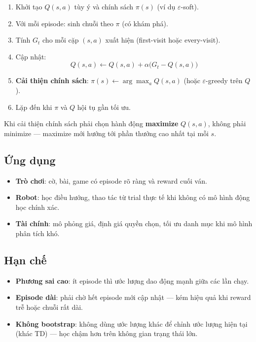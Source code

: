 \begin{phuongphap}[title={Thuật toán MC control (generating traces)}]
\begin{enumerate}
  \item Khởi tạo $Q(s,a)$ tùy ý và chính sách $\pi(s)$ (ví dụ $\varepsilon$-soft).
  \item Với mỗi episode: sinh chuỗi theo $\pi$ (có khám phá).
  \item Tính $G_t$ cho mỗi cặp $(s,a)$ xuất hiện (first-visit hoặc every-visit).
  \item Cập nhật:
  \[
  Q(s,a) \leftarrow Q(s,a) + \alpha\bigl(G_t - Q(s,a)\bigr)
  \]
  \item \textbf{Cải thiện chính sách}: $\pi(s) \leftarrow \arg\max_a Q(s,a)$ (hoặc $\varepsilon$-greedy trên $Q$).
  \item Lặp đến khi $\pi$ và $Q$ hội tụ gần tối ưu.
\end{enumerate}
\end{phuongphap}

\begin{luuy}[title={Sửa nhầm ``minimize $Q$''}]
Khi cải thiện chính sách phải chọn hành động \textbf{maximize} $Q(s,a)$, không phải minimize --- maximize mới hướng tới phần thưởng cao nhất tại mỗi $s$.
\end{luuy}

\subsection{Ứng dụng}

\begin{tinhchat}[title={Ứng dụng điển hình}]
\begin{itemize}
  \item \textbf{Trò chơi}: cờ, bài, game có episode rõ ràng và reward cuối ván.
  \item \textbf{Robot}: học điều hướng, thao tác từ trial thực tế khi không có mô hình động học chính xác.
  \item \textbf{Tài chính}: mô phỏng giá, định giá quyền chọn, tối ưu danh mục khi mô hình phân tích khó.
\end{itemize}
\end{tinhchat}

\subsection{Hạn chế}

\begin{luuy}[title={Hạn chế Monte Carlo}]
\begin{itemize}
  \item \textbf{Phương sai cao}: ít episode thì ước lượng dao động mạnh giữa các lần chạy.
  \item \textbf{Episode dài}: phải chờ hết episode mới cập nhật --- kém hiệu quả khi reward trễ hoặc chuỗi rất dài.
  \item \textbf{Không bootstrap}: không dùng ước lượng khác để chỉnh ước lượng hiện tại (khác TD) --- học chậm hơn trên không gian trạng thái lớn.
\end{itemize}
\end{luuy}
